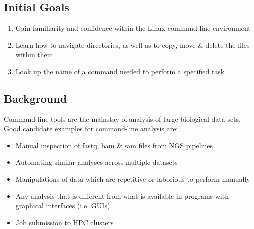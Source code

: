 
\chapter{\moduleTitle}
\newpage

\section{Initial Goals}
\begin{enumerate}
\item Gain familiarity and confidence within the Linux command-line environment
\item Learn how to navigate directories, as well as to copy, move \& delete the files within them
\item Look up the name of a command needed to perform a specified task
\end{enumerate}


\section{Background}
Command-line tools are the mainstay of analysis of large biological data sets.
Good candidate examples for command-line analysis are:
\begin{itemize}
\item Manual inspection of fastq, bam \& sam files from NGS pipelines
\item Automating similar analyses across multiple datasets
\item Manipulations of data which are repetitive or laborious to perform manually
\item Any analysis that is different from what is available in programs with graphical interfaces (i.e. GUIs).
\item Job submission to HPC clusters
\end{itemize}  

